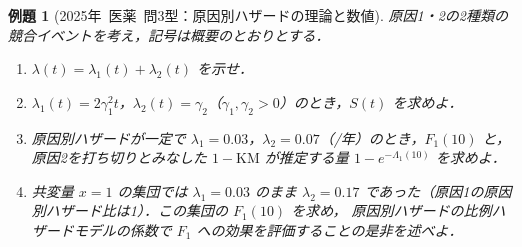 \documentclass[a4paper,11pt,openany]{ltjsbook}
\newtheorem{reidai}{例題}[chapter]
\newcommand{\kakomon}[2]{\mbox{#1年 医薬 問#2}}
\begin{document}
\begin{reidai}[\kakomon{2025}{3}型：原因別ハザードの理論と数値]\label{reidai:m05-2}
原因1・2の2種類の競合イベントを考え，記号は概要のとおりとする．
\begin{enumerate}[label=〔\arabic*〕]
\item $\lambda(t)=\lambda_1(t)+\lambda_2(t)$ を示せ．
\item $\lambda_1(t)=2\gamma_1^2t$，$\lambda_2(t)=\gamma_2$（$\gamma_1,\gamma_2>0$）のとき，$S(t)$ を求めよ．
\item 原因別ハザードが一定で $\lambda_1=0.03$，$\lambda_2=0.07$（/年）のとき，$F_1(10)$ と，原因2を打ち切りとみなした $1-\mathrm{KM}$ が推定する量 $1-e^{-\Lambda_1(10)}$ を求めよ．
\item 共変量 $x=1$ の集団では $\lambda_1=0.03$ のまま $\lambda_2=0.17$ であった（原因1の原因別ハザード比は1）．この集団の $F_1(10)$ を求め，
      原因別ハザードの比例ハザードモデルの係数で $F_1$ への効果を評価することの是非を述べよ．
\end{enumerate}
\end{reidai}

\end{document}
